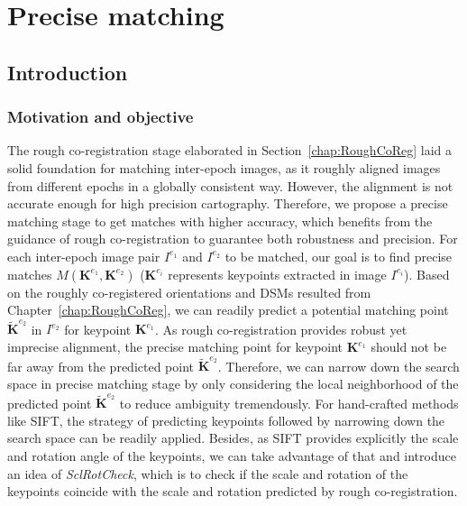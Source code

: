 
\chapter{Precise matching}
\label{chap:Precisematching}
\minitoc

\section{Introduction}
\subsection{Motivation and objective}
The rough co-registration stage elaborated in Section~\ref{chap:RoughCoReg} laid a solid foundation for matching inter-epoch images, as it roughly aligned images from different epochs in a globally consistent way. However, the alignment is not accurate enough for high precision cartography. 
Therefore, we propose a precise matching stage to get matches with higher accuracy, which benefits from the guidance of rough co-registration to guarantee both robustness and precision. 
For each inter-epoch image pair $I^{e_1}$ and $I^{e_2}$ to be matched, our goal is to find precise matches $M({\mathbf{K}^{e_1},\mathbf{K}^{e_2}})$ ($\mathbf{K}^{e_i}$ represents keypoints extracted in image $I^{e_i}$). 
Based on the roughly co-registered orientations and \ac{DSM}s resulted from Chapter~\ref{chap:RoughCoReg}, 
we can readily predict a potential matching point $\widetilde{\mathbf{K}}^{e_2}$ in $I^{e_2}$ for keypoint $\mathbf{K}^{e_1}$. %
As rough co-registration provides robust yet imprecise alignment, the precise matching point for keypoint $\mathbf{K}^{e_1}$ should not be far away from the predicted point $\widetilde{\mathbf{K}}^{e_2}$. Therefore, we can narrow down the search space in precise matching stage by only considering the local neighborhood of the predicted point $\widetilde{\mathbf{K}}^{e_2}$ to reduce ambiguity tremendously. 
For hand-crafted methods like SIFT, the strategy of predicting keypoints followed by narrowing down the search space can be readily applied. Besides, as SIFT provides explicitly the scale and rotation angle of the keypoints, we can take advantage of that and introduce an idea of \textit{SclRotCheck}, which is to check if the scale and rotation of the keypoints coincide with the scale and rotation predicted by rough co-registration.\\
